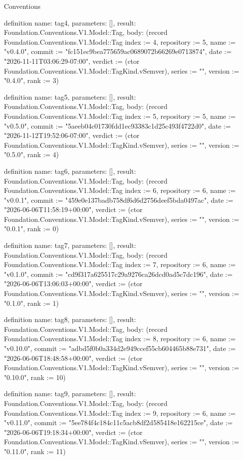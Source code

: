 \begin{lexlean}{Conventions}
\begin{semanticmodule}
definition{
  name: tag4,
  parameters: [],
  result: Foundation.Conventions.V1.Model::Tag,
  body: (record Foundation.Conventions.V1.Model::Tag {index := 4, repository := 5, name := "v0.4.0", commit := "fc151ec9bea775659ac0689072b66269e0713874", date := "2026-11-11T03:06:29-07:00", verdict := (ctor Foundation.Conventions.V1.Model::TagKind.vSemver), series := "", version := "0.4.0", rank := 3})
}

definition{
  name: tag5,
  parameters: [],
  result: Foundation.Conventions.V1.Model::Tag,
  body: (record Foundation.Conventions.V1.Model::Tag {index := 5, repository := 5, name := "v0.5.0", commit := "5aeeb04c01730fdd1ec93383c1d25c493f4722d0", date := "2026-11-12T19:52:06-07:00", verdict := (ctor Foundation.Conventions.V1.Model::TagKind.vSemver), series := "", version := "0.5.0", rank := 4})
}

definition{
  name: tag6,
  parameters: [],
  result: Foundation.Conventions.V1.Model::Tag,
  body: (record Foundation.Conventions.V1.Model::Tag {index := 6, repository := 6, name := "v0.0.1", commit := "459e0e137badb758df6d6d2756deef5bda0497ac", date := "2026-06-06T11:58:19+00:00", verdict := (ctor Foundation.Conventions.V1.Model::TagKind.vSemver), series := "", version := "0.0.1", rank := 0})
}

definition{
  name: tag7,
  parameters: [],
  result: Foundation.Conventions.V1.Model::Tag,
  body: (record Foundation.Conventions.V1.Model::Tag {index := 7, repository := 6, name := "v0.1.0", commit := "cd9f317a625517c29a9276ca26dcd0ad5c7dc196", date := "2026-06-06T13:06:03+00:00", verdict := (ctor Foundation.Conventions.V1.Model::TagKind.vSemver), series := "", version := "0.1.0", rank := 1})
}

definition{
  name: tag8,
  parameters: [],
  result: Foundation.Conventions.V1.Model::Tag,
  body: (record Foundation.Conventions.V1.Model::Tag {index := 8, repository := 6, name := "v0.10.0", commit := "adbd5f0b0a334d2e949ccef55cb604465b88e731", date := "2026-06-06T18:48:58+00:00", verdict := (ctor Foundation.Conventions.V1.Model::TagKind.vSemver), series := "", version := "0.10.0", rank := 10})
}

definition{
  name: tag9,
  parameters: [],
  result: Foundation.Conventions.V1.Model::Tag,
  body: (record Foundation.Conventions.V1.Model::Tag {index := 9, repository := 6, name := "v0.11.0", commit := "5ee784f4c184c11c5acb8df2d585418e162215ce", date := "2026-06-06T19:18:34+00:00", verdict := (ctor Foundation.Conventions.V1.Model::TagKind.vSemver), series := "", version := "0.11.0", rank := 11})
}


\end{semanticmodule}
\end{lexlean}
